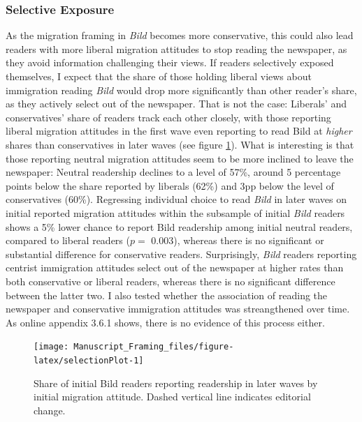 \documentclass[
  12pt,
]{article}
\begin{document}
\hypertarget{selective-exposure}{%
\subsubsection{Selective Exposure}\label{selective-exposure}}

As the migration framing in \emph{Bild} becomes more conservative, this could also lead readers with more liberal migration attitudes to stop reading the newspaper, as they avoid information challenging their views. If readers selectively exposed themselves, I expect that the share of those holding liberal views about immigration reading \emph{Bild} would drop more significantly than other reader's share, as they actively select out of the newspaper. That is not the case: Liberals' and conservatives' share of readers track each other closely, with those reporting liberal migration attitudes in the first wave even reporting to read Bild at \emph{higher} shares than conservatives in later waves (see figure \ref{fig:selectionPlot}). What is interesting is that those reporting neutral migration attitudes seem to be more inclined to leave the newspaper: Neutral readership declines to a level of 57\%, around 5 percentage points below the share reported by liberals (62\%) and 3pp below the level of conservatives (60\%). Regressing individual choice to read \emph{Bild} in later waves on initial reported migration attitudes within the subsample of initial \emph{Bild} readers shows a 5\% lower chance to report Bild readership among initial neutral readers, compared to liberal readers (\(p =\) 0.003), whereas there is no significant or substantial difference for conservative readers. Surprisingly, \emph{Bild} readers reporting centrist immigration attitudes select out of the newspaper at higher rates than both conservative or liberal readers, whereas there is no significant difference between the latter two. I also tested whether the association of reading the newspaper and conservative immigration attitudes was streangthened over time. As online appendix 3.6.1 shows, there is no evidence of this process either.

\begin{figure}[!ht]

{\centering \texttt{[image: Manuscript\_Framing\_files/figure-latex/selectionPlot-1]} 

}

\caption{Share of initial Bild readers reporting readership in later waves by initial migration attitude. Dashed vertical line indicates editorial change.}\label{fig:selectionPlot}
\end{figure}
\end{document}
